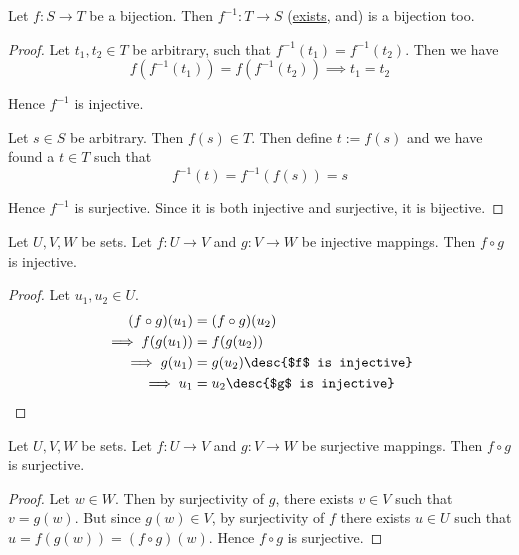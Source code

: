 \label{fb1a7df}

Let $f:S\to T$ be a bijection. Then $f^{-1}:T\to S$ (\href{b2530a8}{exists},
and) is a bijection too.

\begin{proof}
  Let $t_1,t_2\in T$ be arbitrary, such that $f^{-1}(t_1)=f^{-1}(t_2)$. Then we
  have
  \begin{equation*}
    f(f^{-1}(t_1))=f(f^{-1}(t_2))\implies t_1=t_2
  \end{equation*}

  Hence $f^{-1}$ is injective.

  Let $s\in S$ be arbitrary. Then $f(s)\in T$. Then define $t:=f(s)$ and we
  have found a $t\in T$ such that
  $$
    f^{-1}(t)=f^{-1}(f(s))=s
  $$

  Hence $f^{-1}$ is surjective. Since it is both injective and surjective, it
  is bijective.
\end{proof}

\label{da8a3cf}

Let $U,V,W$ be sets. Let $f:U\to V$ and $g:V\to W$ be injective mappings. Then
$f\circ g$ is injective.

\begin{proof}
  Let $u_1,u_2\in U$.
  \begin{align*}
    (f\circ g)(u_1)    &=(f\circ g)(u_2)               \\
    \implies f(g(u_1)) &=f(g(u_2))                     \\
    \implies g(u_1)    &=g(u_2)\desc{$f$ is injective} \\
    \implies u_1       &=u_2\desc{$g$ is injective}
  \end{align*}
\end{proof}

\label{b248581}

Let $U,V,W$ be sets. Let $f:U\to V$ and $g:V\to W$ be surjective mappings. Then
$f\circ g$ is surjective.

\begin{proof}
  Let $w\in W$. Then by surjectivity of $g$, there exists $v\in V$ such that
  $v=g(w)$. But since $g(w)\in V$, by surjectivity of $f$ there exists $u\in U$
  such that $u=f(g(w))=(f\circ g)(w)$. Hence $f\circ g$ is surjective.
\end{proof}

\label{c0883e7}

